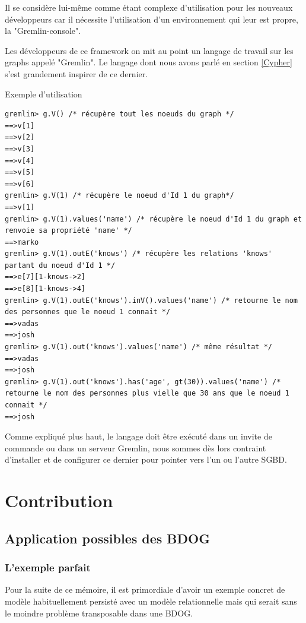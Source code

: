 \documentclass[a4paper,fleqn,12pt]{report}
\begin{document}
Il se considère lui-même comme étant complexe d'utilisation pour les nouveaux développeurs car il nécessite l'utilisation d'un environnement qui leur est propre, la "Gremlin-console".

Les développeurs de ce framework on mit au point un langage de travail sur les graphs appelé "Gremlin". Le langage dont nous avons parlé en section \ref{Cypher} s'est grandement inspirer de ce dernier.

Exemple d'utilisation 

\begin{lstlisting}
gremlin> g.V() /* récupère tout les noeuds du graph */
==>v[1]
==>v[2]
==>v[3]
==>v[4]
==>v[5]
==>v[6]
gremlin> g.V(1) /* récupère le noeud d'Id 1 du graph*/
==>v[1]
gremlin> g.V(1).values('name') /* récupère le noeud d'Id 1 du graph et renvoie sa propriété 'name' */
==>marko
gremlin> g.V(1).outE('knows') /* récupère les relations 'knows' partant du noeud d'Id 1 */
==>e[7][1-knows->2]
==>e[8][1-knows->4]
gremlin> g.V(1).outE('knows').inV().values('name') /* retourne le nom des personnes que le noeud 1 connait */
==>vadas
==>josh
gremlin> g.V(1).out('knows').values('name') /* même résultat */
==>vadas
==>josh
gremlin> g.V(1).out('knows').has('age', gt(30)).values('name') /* retourne le nom des personnes plus vielle que 30 ans que le noeud 1 connait */
==>josh
\end{lstlisting}

Comme expliqué plus haut, le langage doit être exécuté dans un invite de commande ou dans un serveur Gremlin, nous sommes dès lors contraint d'installer et de configurer ce dernier pour pointer vers l'un ou l'autre SGBD.



\part{Contribution}
\chapter{Application possibles des BDOG}

\section{L'exemple parfait}

Pour la suite de ce mémoire, il est primordiale d'avoir un exemple concret de modèle habituellement persisté avec un modèle relationnelle mais qui serait sans le moindre problème transposable dans une BDOG.
\end{document}
